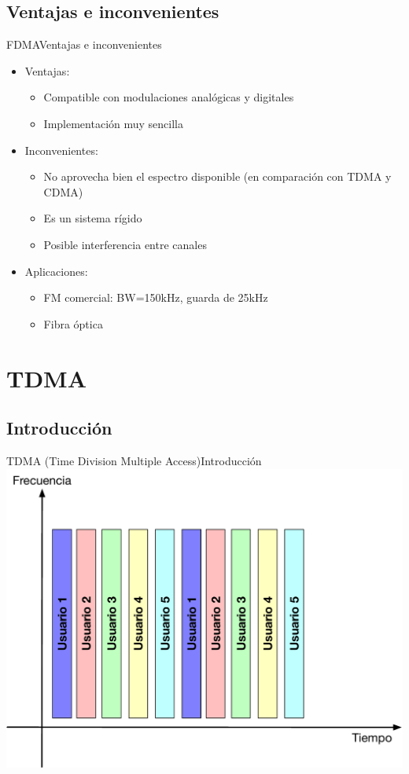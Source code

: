 \documentclass[10pt,compress]{beamer} %
\begin{document}
\subsection{Ventajas e inconvenientes}
\begin{frame}{FDMA}{Ventajas e inconvenientes}
  \begin{itemize}
    \item Ventajas:
      \begin{itemize}
        \item Compatible con modulaciones analógicas y digitales
        \item Implementación muy sencilla
      \end{itemize}
    \item Inconvenientes:
      \begin{itemize}
        \item No aprovecha bien el espectro disponible (en comparación con TDMA y CDMA)
        \item Es un sistema rígido
        \item Posible interferencia entre canales
      \end{itemize}
    \item Aplicaciones:
      \begin{itemize}
        \item FM comercial: BW=150kHz, guarda de 25kHz
        \item Fibra óptica
      \end{itemize}
  \end{itemize}
\end{frame}


\section{TDMA}
\subsection{Introducción}
\begin{frame}{TDMA (Time Division Multiple Access)}{Introducción}
  \centering \includegraphics[width=0.8\linewidth]{../Apuntes/Figuras/TDMA.pdf}
\end{frame}
\end{document}
